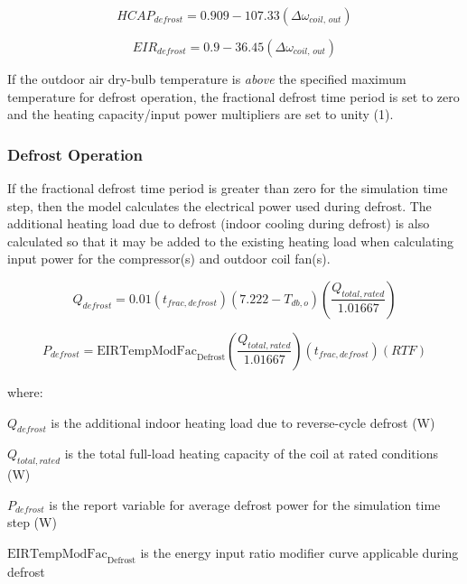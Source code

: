 \begin{equation}
  HCAP_{defrost} = 0.909 - 107.33 \left( \Delta \omega_{coil,\,out} \right)
\end{equation}

\begin{equation}
  EIR_{defrost} = 0.9 - 36.45 \left( \Delta \omega_{coil,\,out} \right)
\end{equation}

If the outdoor air dry-bulb temperature is \emph{above} the specified maximum temperature for defrost operation, the fractional defrost time period is set to zero and the heating capacity/input power multipliers are set to unity (1).

\subsubsection{Defrost Operation}\label{defrost-operation-201605050925}

If the fractional defrost time period is greater than zero for the simulation time step, then the model calculates the electrical power used during defrost. The additional heating load due to defrost (indoor cooling during defrost) is also calculated so that it may be added to the existing heating load when calculating input power for the compressor(s) and outdoor coil fan(s).

\begin{equation}
  Q_{defrost} = 0.01 \left( t_{frac,defrost} \right) \left( 7.222 - T_{db,o} \right) \left( \frac{Q_{total,rated}}{1.01667} \right)
\end{equation}

\begin{equation}
  P_{defrost} = \mathrm{EIRTempModFac}_{\mathrm{Defrost}} \left( \frac{Q_{total,rated}}{1.01667} \right) \left( t_{frac,defrost} \right) \left( RTF \right)
\end{equation}

where:

\(Q_{defrost}\) is the additional indoor heating load due to reverse-cycle defrost (W)

\(Q_{total,rated}\) is the total full-load heating capacity of the coil at rated conditions (W)

\(P_{defrost}\) is the report variable for average defrost power for the simulation time step (W)

$\mathrm{EIRTempModFac}_{\mathrm{Defrost}}$ is the energy input ratio modifier curve applicable during defrost

